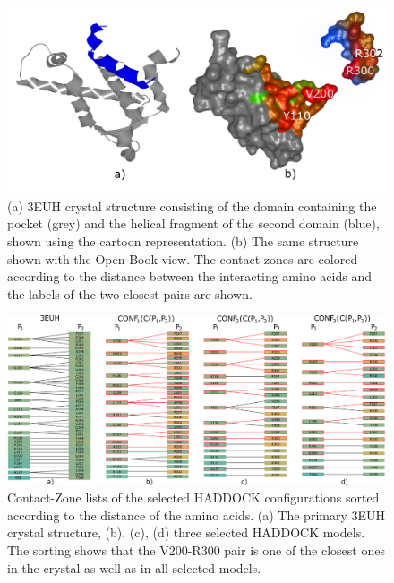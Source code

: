 \documentclass{bmcart}
\def\OpBook {Open-Book view\xspace}
\def\CoZoLists{Contact-Zone lists\xspace}
\begin{document}
\begin{backmatter}
\begin{figure}[h!]
    \centering
    \includegraphics[width=0.9\columnwidth]{images/figure15.pdf}
    \caption{(a) 3EUH crystal structure consisting of the domain containing the pocket (grey) and the helical fragment of the second domain (blue), shown using the cartoon representation. (b) The same structure shown with the \OpBook. The contact zones are colored according to the distance between the interacting amino acids and the labels of the two closest pairs are shown.}
  \label{fig:MukEF_crystal_3EUH_selected}
\end{figure}

\begin{figure}[h!]
    \centering
    \includegraphics[width=0.9\columnwidth]{images/figure16.pdf}
    \caption{ \CoZoLists of the selected HADDOCK configurations sorted according to the distance of the amino acids. (a) The primary 3EUH crystal structure, (b), (c), (d) three selected HADDOCK models. The sorting shows that the V200-R300 pair is one of the closest ones in the crystal as well as in all selected models.}
  \label{fig:list_pocket_string}
\end{figure}


\end{backmatter}
\end{document}
